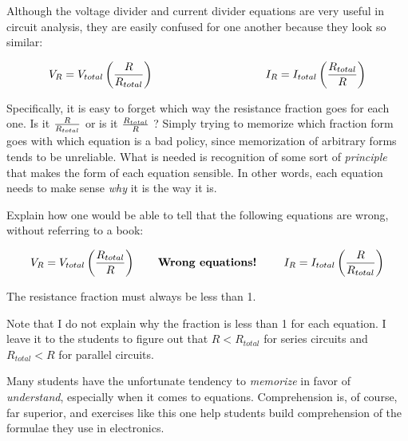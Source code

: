 

Although the voltage divider and current divider equations are very useful in circuit analysis, they are easily confused for one another because they look so similar:

$$V_R = V_{total}\left( {R \over R_{total}} \right) \hbox{\hskip 100pt} I_R = I_{total}\left( {R_{total} \over R} \right)$$

Specifically, it is easy to forget which way the resistance fraction goes for each one.  Is it ${R \over R_{total}}$ or is it ${R_{total} \over R}$ ?  Simply trying to memorize which fraction form goes with which equation is a bad policy, since memorization of arbitrary forms tends to be unreliable.  What is needed is recognition of some sort of {\it principle} that makes the form of each equation sensible.  In other words, each equation needs to make sense {\it why} it is the way it is.

Explain how one would be able to tell that the following equations are wrong, without referring to a book:

$$V_R = V_{total}\left( {R_{total} \over R} \right) \hbox{\hskip 20pt {\bf Wrong equations!} \hskip 20pt} I_R = I_{total}\left( {R \over R_{total}} \right)$$







The resistance fraction must always be less than 1.







Note that I do not explain why the fraction is less than 1 for each equation.  I leave it to the students to figure out that $R < R_{total}$ for series circuits and $R_{total} < R$ for parallel circuits.

Many students have the unfortunate tendency to {\it memorize} in favor of {\it understand}, especially when it comes to equations.  Comprehension is, of course, far superior, and exercises like this one help students build comprehension of the formulae they use in electronics.




